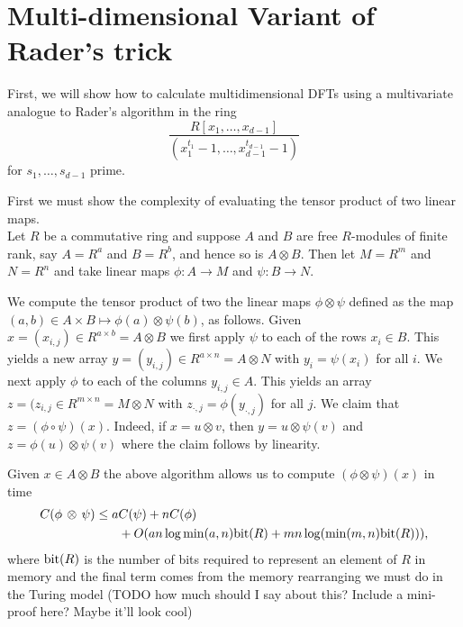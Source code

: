 \section{Multi-dimensional Variant of Rader's trick}%
\label{sec:multi_dimensional_variant_of_rader_s_trick}

First, we will show how to calculate multidimensional DFTs using a multivariate analogue to Rader's algorithm in the ring
\[
    \frac{R[x_1, \ldots, x_{d-1}]}{(x_1^{t_1} - 1, \ldots, x_{d-1}^{t_{d-1}} - 1)}
\]
for $s_1, \ldots, s_{d-1}$ prime.



First we must show the complexity of evaluating the tensor product of two linear maps.\\
Let $R$ be a commutative ring and suppose $A$ and $B$ are free $R$-modules of finite rank, say $A = R^a$ and $B = R^b$, and hence so is $A \otimes B$. Then let $M = R^m$ and $N = R^n$ and take linear maps $\phi: A \to M$ and $\psi : B \to N$.

We compute the tensor product of two the linear maps $\phi \otimes \psi$ defined as the map $(a, b) \in A\times B \mapsto \phi(a) \otimes \psi(b)$, as follows. Given $x = (x_{i,j}) \in R^{a \times b} = A \otimes B$ we first apply $\psi$ to each of the rows $x_i \in B$. This yields a new array $y = (y_{i, j}) \in R^{a \times n} = A \otimes N$ with $y_i = \psi(x_i)$ for all $i$. We next apply $\phi$ to each of the columns $y_{i, j} \in A$. This yields an array $z = (z_{i, j} \in R^{m \times n} = M \otimes N$ with $z_{\cdot , j} = \phi(y_{\cdot, j})$ for all $j$. We claim that $z = (\phi \circ \psi)(x)$. Indeed, if $x = u \otimes v$, then $y = u \otimes \psi(v)$ and $z = \phi(u) \otimes \psi(v)$ where the claim follows by linearity.

Given $x \in A \otimes B$ the above algorithm allows us to compute $(\phi \otimes \psi) (x)$ in time
\begin{align*}
    C(\phi \,\otimes\, \psi) \leq a&C(\psi) + nC(\phi)\\
                                   &+ O(a n \log \min(a, n) \textrm{bit}(R) + m n \log( \min (m, n)\textrm{bit}(R))),
\end{align*}
where $\textrm{bit}(R)$ is the number of bits required to represent an element of $R$ in memory and the final term comes from the memory rearranging we must do in the Turing model (TODO how much should I say about this? Include a mini-proof here? Maybe it'll look cool)

